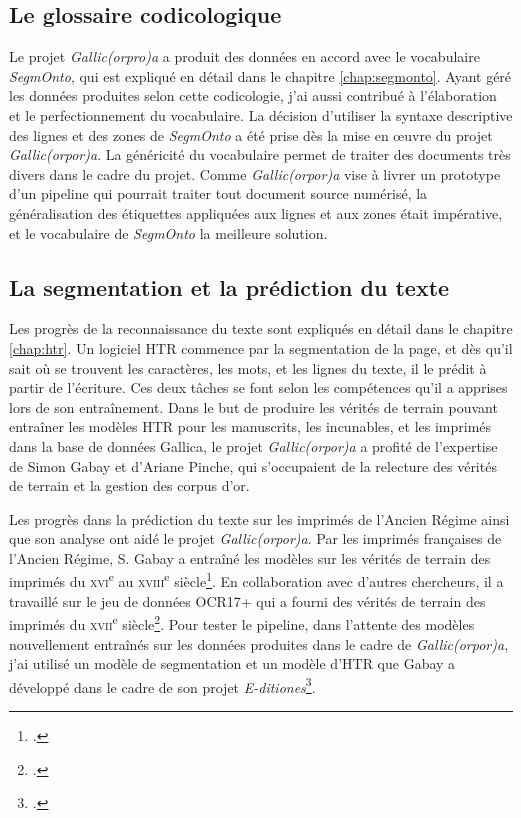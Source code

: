 \documentclass[class=article, crop=false]{standalone}
\begin{document}
\subsection{Le glossaire codicologique}
Le projet \textit{Gallic(orpro)a} a produit des données en accord avec le vocabulaire \textit{SegmOnto}, qui est expliqué en détail dans le chapitre \ref{chap:segmonto}. Ayant géré les données produites selon cette codicologie, j'ai aussi contribué à l'élaboration et le perfectionnement du vocabulaire. La décision d'utiliser la syntaxe descriptive des lignes et des zones de \textit{SegmOnto} a été prise dès la mise en œuvre du projet \textit{Gallic(orpor)a}. La généricité du vocabulaire permet de traiter des documents très divers dans le cadre du projet. Comme \textit{Gallic(orpor)a} vise à livrer un prototype d'un pipeline qui pourrait traiter tout document source numérisé, la généralisation des étiquettes appliquées aux lignes et aux zones était impérative, et le vocabulaire de \textit{SegmOnto} la meilleure solution.

\subsection{La segmentation et la prédiction du texte}
Les progrès de la reconnaissance du texte sont expliqués en détail dans le chapitre \ref{chap:htr}. Un logiciel \acrshort{HTR} commence par la segmentation de la page, et dès qu'il sait où se trouvent les caractères, les mots, et les lignes du texte, il le prédit à partir de l'écriture. Ces deux tâches se font selon les compétences qu'il a apprises lors de son entraînement. Dans le but de produire les vérités de terrain pouvant entraîner les modèles \acrshort{HTR} pour les manuscrits, les incunables, et les imprimés dans la base de données Gallica, le projet \textit{Gallic(orpor)a} a profité de l'expertise de Simon Gabay et d'Ariane Pinche, qui s'occupaient de la relecture des vérités de terrain et la gestion des corpus d'or.

Les progrès dans la prédiction du texte sur les imprimés de l'Ancien Régime ainsi que son analyse ont aidé le projet \textit{Gallic(orpor)a}. Par les imprimés françaises de l'Ancien Régime, S. Gabay a entraîné les modèles sur les vérités de terrain des imprimés du \textsc{xvi}\textsuperscript{e} au \textsc{xviii}\textsuperscript{e} siècle\footcite{gabayStandardizingLinguisticData2020}. En collaboration avec d'autres chercheurs, il a travaillé sur le jeu de données OCR17+ qui a fourni des vérités de terrain des imprimés du \textsc{xvii}\textsuperscript{e} siècle\footcite{gabayOCR17GroundTruth2020}. Pour tester le pipeline, dans l'attente des modèles nouvellement entraînés sur les données produites dans le cadre de \textit{Gallic(orpor)a}, j'ai utilisé un modèle de segmentation et un modèle d'\acrshort{HTR} que Gabay a développé dans le cadre de son projet \textit{E-ditiones}\footcite{gabayEditiones17thFrench2018}.
\end{document}
